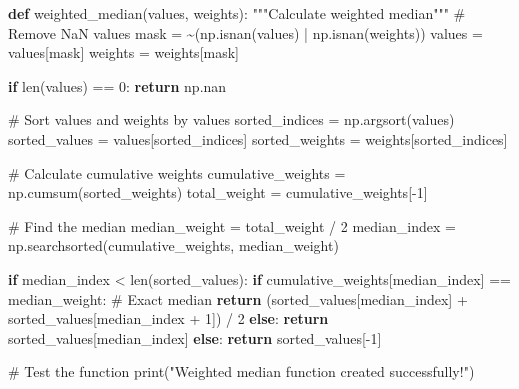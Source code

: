 \documentclass[
  letterpaper,
  DIV=11,
  numbers=noendperiod]{scrartcl}
\newenvironment{Shaded}{\begin{snugshade}}{\end{snugshade}}
\newcommand{\BuiltInTok}[1]{\textcolor[rgb]{0.00,0.23,0.31}{#1}}
\newcommand{\CommentTok}[1]{\textcolor[rgb]{0.37,0.37,0.37}{#1}}
\newcommand{\ControlFlowTok}[1]{\textcolor[rgb]{0.00,0.23,0.31}{\textbf{#1}}}
\newcommand{\DecValTok}[1]{\textcolor[rgb]{0.68,0.00,0.00}{#1}}
\newcommand{\KeywordTok}[1]{\textcolor[rgb]{0.00,0.23,0.31}{\textbf{#1}}}
\newcommand{\NormalTok}[1]{\textcolor[rgb]{0.00,0.23,0.31}{#1}}
\newcommand{\OperatorTok}[1]{\textcolor[rgb]{0.37,0.37,0.37}{#1}}
\newcommand{\StringTok}[1]{\textcolor[rgb]{0.13,0.47,0.30}{#1}}
\begin{document}
\begin{Shaded}
\begin{Highlighting}[]
\KeywordTok{def}\NormalTok{ weighted\_median(values, weights):}
    \CommentTok{"""Calculate weighted median"""}
    \CommentTok{\# Remove NaN values}
\NormalTok{    mask }\OperatorTok{=} \OperatorTok{\textasciitilde{}}\NormalTok{(np.isnan(values) }\OperatorTok{|}\NormalTok{ np.isnan(weights))}
\NormalTok{    values }\OperatorTok{=}\NormalTok{ values[mask]}
\NormalTok{    weights }\OperatorTok{=}\NormalTok{ weights[mask]}

    \ControlFlowTok{if} \BuiltInTok{len}\NormalTok{(values) }\OperatorTok{==} \DecValTok{0}\NormalTok{:}
        \ControlFlowTok{return}\NormalTok{ np.nan}

    \CommentTok{\# Sort values and weights by values}
\NormalTok{    sorted\_indices }\OperatorTok{=}\NormalTok{ np.argsort(values)}
\NormalTok{    sorted\_values }\OperatorTok{=}\NormalTok{ values[sorted\_indices]}
\NormalTok{    sorted\_weights }\OperatorTok{=}\NormalTok{ weights[sorted\_indices]}

    \CommentTok{\# Calculate cumulative weights}
\NormalTok{    cumulative\_weights }\OperatorTok{=}\NormalTok{ np.cumsum(sorted\_weights)}
\NormalTok{    total\_weight }\OperatorTok{=}\NormalTok{ cumulative\_weights[}\OperatorTok{{-}}\DecValTok{1}\NormalTok{]}

    \CommentTok{\# Find the median}
\NormalTok{    median\_weight }\OperatorTok{=}\NormalTok{ total\_weight }\OperatorTok{/} \DecValTok{2}
\NormalTok{    median\_index }\OperatorTok{=}\NormalTok{ np.searchsorted(cumulative\_weights, median\_weight)}

    \ControlFlowTok{if}\NormalTok{ median\_index }\OperatorTok{\textless{}} \BuiltInTok{len}\NormalTok{(sorted\_values):}
        \ControlFlowTok{if}\NormalTok{ cumulative\_weights[median\_index] }\OperatorTok{==}\NormalTok{ median\_weight:}
            \CommentTok{\# Exact median}
            \ControlFlowTok{return}\NormalTok{ (sorted\_values[median\_index] }\OperatorTok{+}\NormalTok{ sorted\_values[median\_index }\OperatorTok{+} \DecValTok{1}\NormalTok{]) }\OperatorTok{/} \DecValTok{2}
        \ControlFlowTok{else}\NormalTok{:}
            \ControlFlowTok{return}\NormalTok{ sorted\_values[median\_index]}
    \ControlFlowTok{else}\NormalTok{:}
        \ControlFlowTok{return}\NormalTok{ sorted\_values[}\OperatorTok{{-}}\DecValTok{1}\NormalTok{]}

\CommentTok{\# Test the function}
\BuiltInTok{print}\NormalTok{(}\StringTok{"Weighted median function created successfully!"}\NormalTok{)}
\end{Highlighting}
\end{Shaded}
\end{document}
